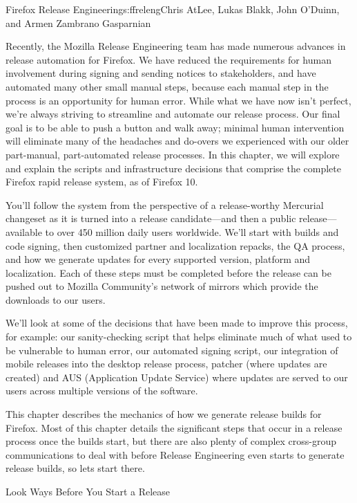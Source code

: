 \begin{aosachapter}{Firefox Release Engineering}{s:ffreleng}{Chris AtLee, Lukas Blakk, John O'Duinn, and Armen Zambrano Gasparnian}

Recently, the Mozilla Release Engineering team has made numerous advances
in release automation for Firefox. We have
reduced the requirements for human involvement during signing and sending
notices to stakeholders, and have automated
many other small manual steps, because each manual step in the process is an
opportunity for human error. While what we have now isn't perfect,
we're always striving to streamline and automate our release
process. Our final goal is to be able to push a button and walk away;
minimal human intervention will eliminate many of the
headaches and do-overs we experienced with our older part-manual,
part-automated release processes. In this chapter, we will explore and
explain the scripts and infrastructure decisions that comprise
the complete Firefox rapid release system, as of Firefox 10.

You'll follow the system from the perspective of a release-worthy
Mercurial changeset as it is turned into a release candidate---and
then a public release---available to over 450 million daily users
worldwide.  We'll start with builds and code signing, then customized
partner and localization repacks, the QA process, and how we generate
updates for every supported version, platform and localization. Each of
these steps must be completed before the release can be pushed out to
Mozilla Community's network of mirrors which provide the downloads to
our users.

We'll look at some of the decisions that have been made to
improve this process, for example: our sanity-checking script that helps
eliminate much of what used to be vulnerable to human error, our
automated signing script, our integration of mobile releases into the
desktop release process, patcher (where updates are created) and AUS (Application Update Service) where updates are
served to our users across multiple versions of the software.

This chapter describes the mechanics of how we generate release builds
for Firefox. Most of this chapter details the significant
steps that occur in a release process once the builds start, but
there are also plenty of complex cross-group communications to deal
with before Release Engineering even starts to generate release
builds, so lets start there.

\begin{aosasect1}{Look  Ways Before You Start a Release}


\end{aosasect1}
\end{aosachapter}
